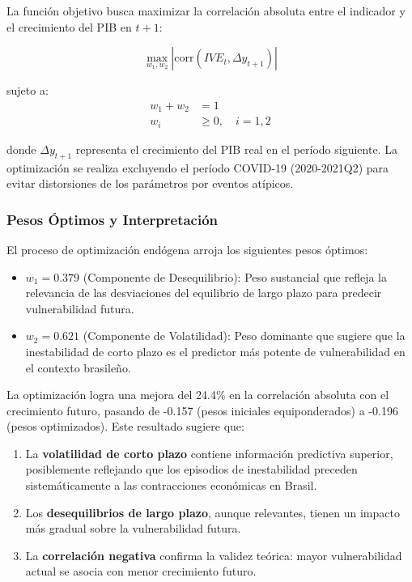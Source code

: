 \documentclass[3p,11pt]{elsarticle}
\begin{document}
La función objetivo busca maximizar la correlación absoluta entre el indicador y el crecimiento del PIB en $t+1$:

\begin{equation}
\max_{w_1,w_2} |\text{corr}(IVE_t, \Delta y_{t+1})|
\label{eq:optimizacion}
\end{equation}

sujeto a:
\begin{align}
w_1 + w_2 &= 1 \\
w_i &\geq 0, \quad i = 1,2
\end{align}

donde $\Delta y_{t+1}$ representa el crecimiento del PIB real en el período siguiente. La optimización se realiza excluyendo el período COVID-19 (2020-2021Q2) para evitar distorsiones de los parámetros por eventos atípicos.

\subsubsection{Pesos Óptimos y Interpretación}

El proceso de optimización endógena arroja los siguientes pesos óptimos:

\begin{itemize}
    \item $w_1 = 0.379$ (Componente de Desequilibrio): Peso sustancial que refleja la relevancia de las desviaciones del equilibrio de largo plazo para predecir vulnerabilidad futura.
    \item $w_2 = 0.621$ (Componente de Volatilidad): Peso dominante que sugiere que la inestabilidad de corto plazo es el predictor más potente de vulnerabilidad en el contexto brasileño.
\end{itemize}

La optimización logra una mejora del 24.4\% en la correlación absoluta con el crecimiento futuro, pasando de -0.157 (pesos iniciales equiponderados) a -0.196 (pesos optimizados). Este resultado sugiere que:

\begin{enumerate}
    \item La \textbf{volatilidad de corto plazo} contiene información predictiva superior, posiblemente reflejando que los episodios de inestabilidad preceden sistemáticamente a las contracciones económicas en Brasil.
    \item Los \textbf{desequilibrios de largo plazo}, aunque relevantes, tienen un impacto más gradual sobre la vulnerabilidad futura.
    \item La \textbf{correlación negativa} confirma la validez teórica: mayor vulnerabilidad actual se asocia con menor crecimiento futuro.
\end{enumerate}
\end{document}
